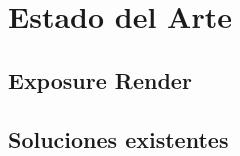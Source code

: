 \chapter{Estado del Arte}
\label{chap:ea}
\section{Exposure Render}
\section{Soluciones existentes}
